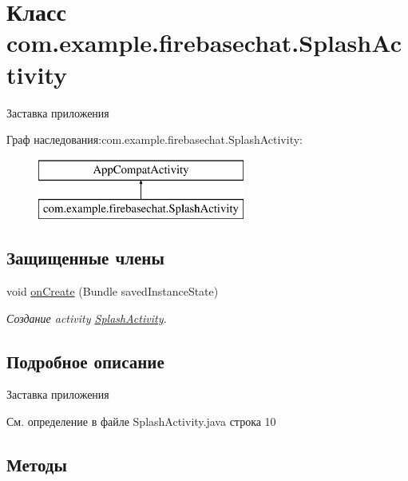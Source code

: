 \hypertarget{classcom_1_1example_1_1firebasechat_1_1_splash_activity}{}\section{Класс com.\+example.\+firebasechat.\+Splash\+Activity}
\label{classcom_1_1example_1_1firebasechat_1_1_splash_activity}


Заставка приложения  


Граф наследования\+:com.\+example.\+firebasechat.\+Splash\+Activity\+:\begin{figure}[H]
\begin{center}
\leavevmode
\includegraphics[height=2.000000cm]{classcom_1_1example_1_1firebasechat_1_1_splash_activity}
\end{center}
\end{figure}
\subsection*{Защищенные члены}
\begin{DoxyCompactItemize}
\item 
void \mbox{\hyperlink{classcom_1_1example_1_1firebasechat_1_1_splash_activity_aa1db23df2ab2a3a5506f29e01d054f84}{on\+Create}} (Bundle saved\+Instance\+State)
\begin{DoxyCompactList}\small\item\em Создание activity \mbox{\hyperlink{classcom_1_1example_1_1firebasechat_1_1_splash_activity}{Splash\+Activity}}. \end{DoxyCompactList}\end{DoxyCompactItemize}


\subsection{Подробное описание}
Заставка приложения 

См. определение в файле Splash\+Activity.\+java строка 10



\subsection{Методы}
\mbox{\label{classcom_1_1example_1_1firebasechat_1_1_splash_activity_aa1db23df2ab2a3a5506f29e01d054f84}} 
